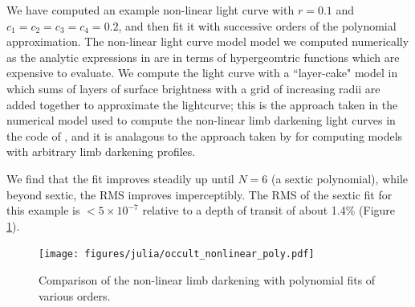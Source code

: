 \documentclass[modern]{aastex61}
\begin{document}
We have computed an example non-linear light curve with $r=0.1$ and
$c_1=c_2=c_3=c_4=0.2$, and then fit it with successive orders of the
polynomial approximation.  The non-linear light curve model model
we computed numerically as the analytic expressions in \citet{MandelAgol2002}
are in terms of hypergeomtric functions which are expensive to evaluate.  
We compute the light curve with a ``layer-cake" model in which sums of 
layers of surface brightness with a grid of increasing radii are added together 
to approximate the lightcurve;  this
is the approach taken in the numerical model used to compute the
non-linear limb darkening light curves in the code of \citet{MandelAgol2002},
and it is analagous to the approach taken by \citet{Kreidberg2015} for
computing models with arbitrary limb darkening profiles.

We find that the fit improves steadily up until $N=6$ (a sextic
polynomial), while beyond sextic, the RMS improves imperceptibly.
The RMS of the sextic fit for this example is $<5 \times 10^{-7}$
relative to a depth of transit of about 1.4\% (Figure \ref{fig:nonlinear}).

\begin{figure}
    \begin{centering}
    \texttt{[image: figures/julia/occult\_nonlinear\_poly.pdf]}
    \caption{Comparison of the non-linear limb darkening with polynomial
    fits of various orders. 
    \label{fig:nonlinear}}
    \end{centering}
\end{figure}

%
%
%
%
\end{document}
